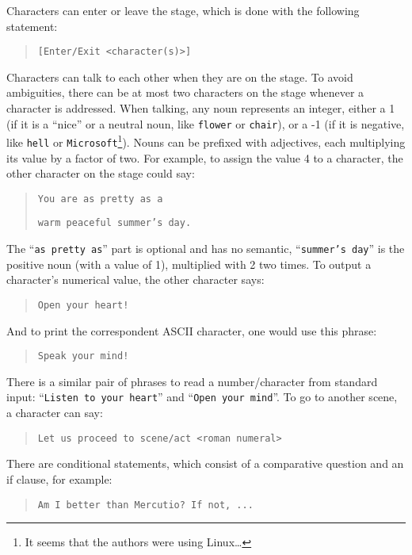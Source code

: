 Characters can enter or leave the stage, which is done with the following statement:

\begin{quotation}
    \texttt{[Enter/Exit <character(s)>]}
\end{quotation}

Characters can talk to each other when they are on the stage. To avoid ambiguities, there can be at most two characters on the stage whenever a character is addressed. When talking, any noun represents an integer, either a 1 (if it is a “nice” or a neutral noun, like \texttt{flower} or \texttt{chair}), or a -1 (if it is negative, like \texttt{hell} or \texttt{Microsoft}\footnote{It seems that the authors were using Linux\dots}). Nouns can be prefixed with adjectives, each multiplying its value by a factor of two. For example, to assign the value 4 to a character, the other character on the stage could say:

\begin{quotation}
    \texttt{You are as pretty as a}

    \texttt{warm peaceful summer's day.}
\end{quotation}

The “\texttt{as pretty as}” part is optional and has no semantic, “\texttt{summer's day}” is the positive noun (with a value of 1), multiplied with 2 two times. To output a character's numerical value, the other character says:

\begin{quotation}
    \texttt{Open your heart!}
\end{quotation}

And to print the correspondent ASCII character, one would use this phrase:

\begin{quotation}
    \texttt{Speak your mind!}
\end{quotation}

There is a similar pair of phrases to read a number/character from standard input: “\texttt{Listen to your heart}” and “\texttt{Open your mind}”. To go to another scene, a character can say:

\begin{quotation}
    \texttt{Let us proceed to scene/act <roman numeral>}
\end{quotation}

There are conditional statements, which consist of a comparative question and an if clause, for example:

\begin{quotation}
    \texttt{Am I better than Mercutio? If not, ...}
\end{quotation}


